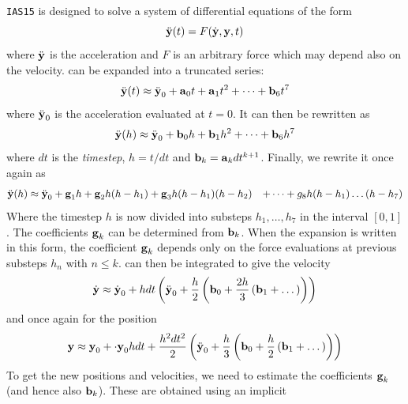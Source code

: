 \documentclass[twoside,openright,titlepage,numbers=noenddot,headinclude,%
                footinclude=true,cleardoublepage=empty,abstractoff, 
                BCOR=5mm,paper=a4,fontsize=11pt,%
                american,%
                ]{scrreprt}%
\begin{document}
\texttt{IAS15} is designed to solve a system of differential equations of the form
\begin{equation}
    \ddot{\boldsymbol{\mathbf{y}}}(t)=F(\dot{\boldsymbol{\mathbf{y}}},\boldsymbol{\mathbf{y}},t)
    \label{eq:diff_eq}
\end{equation}
where $\ddot{\boldsymbol{\mathbf{y}}}$ is the acceleration and $F$ is an arbitrary force
which may depend also on the velocity.  can be expanded
into a truncated series:
\begin{equation}
    \ddot{\boldsymbol{\mathbf{y}}}(t)\approx \ddot{\boldsymbol{\mathbf{y}}}_0 + \boldsymbol{\mathbf{a}}_0t+\boldsymbol{\mathbf{a}}_1t^2
    +\dots+\boldsymbol{\mathbf{b}}_6t^7
\end{equation}
where $\ddot{\boldsymbol{\mathbf{y}}}_0$ is the acceleration evaluated at $t=0$. 
It can then be rewritten as
\begin{equation}
    \ddot{\boldsymbol{\mathbf{y}}}(h)\approx \ddot{\boldsymbol{\mathbf{y}}}_0 + \boldsymbol{\mathbf{b}}_0h+\boldsymbol{\mathbf{b}}_1h^2
    +\dots+\boldsymbol{\mathbf{b}}_6h^7
    \label{eq:diff_eq2}
\end{equation}
where $dt$ is the \emph{timestep}, $h=t/dt$ and $\boldsymbol{\mathbf{b}}_k=\boldsymbol{\mathbf{a}}_kdt^{k+1}$.
Finally, we rewrite it once again as
\begin{equation}
    \begin{aligned}
        \ddot{\boldsymbol{\mathbf{y}}}(h)&\approx \ddot{\boldsymbol{\mathbf{y}}}_0 + \boldsymbol{\mathbf{g}}_1h+\boldsymbol{\mathbf{g}}_2h
        (h-h_1)+\boldsymbol{\mathbf{g}}_3h(h-h_1)(h-h_2)&+\dots+g_8h(h-h_1)\dots(h-h_7)
    \end{aligned}
\end{equation}
Where the timestep $h$ is now divided into substeps $h_1,\dots,h_7$ in the
interval $[0,1]$. The coefficients $\boldsymbol{\mathbf{g}}_k$ can be determined from 
$\boldsymbol{\mathbf{b}}_k$. When the expansion is written in this form, the coefficient 
$\boldsymbol{\mathbf{g}}_k$ depends only on the force evaluations at previous substeps
$h_n$ with $n\leq k$.  can then be integrated to give the velocity
\begin{equation}
    \dot{\boldsymbol{\mathbf{y}}}\approx \dot{\boldsymbol{\mathbf{y}}}_0+hdt\left(\ddot{\boldsymbol{\mathbf{y}}}_0+
    \frac{h}{2} \left(\boldsymbol{\mathbf{b}}_0+ \frac{2h}{3} \left(\boldsymbol{\mathbf{b}}_1+\dots\right)
    \right)\right)
\end{equation}
and once again for the position
\begin{equation}
    \boldsymbol{\mathbf{y}}\approx\boldsymbol{\mathbf{y}}_0+\cdot{\boldsymbol{\mathbf{y}}}_0hdt+ \frac{h^2dt^2}{2} 
    \left(\ddot{\boldsymbol{\mathbf{y}}}_0+
    \frac{h}{3} \left(\boldsymbol{\mathbf{b}}_0+ \frac{h}{2} \left(\boldsymbol{\mathbf{b}}_1+\dots\right)
    \right)\right)
\end{equation}
To get the new positions and velocities, we need to estimate the coefficients
$\boldsymbol{\mathbf{g}}_k$ (and hence also $\boldsymbol{\mathbf{b}}_k$). These are obtained using an implicit
\end{document}
